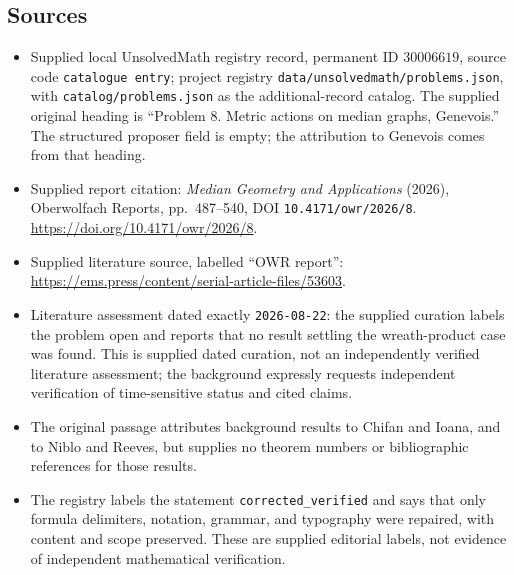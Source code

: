 \documentclass[11pt]{article}
\begin{document}
\subsection{Sources}
\begin{itemize}
\item Supplied local UnsolvedMath registry record, permanent ID \(30006619\), source code \texttt{catalogue entry}; project registry \texttt{data/unsolvedmath/problems.json}, with \texttt{catalog/problems.json} as the additional-record catalog. The supplied original heading is ``Problem 8. Metric actions on median graphs, Genevois.'' The structured proposer field is empty; the attribution to Genevois comes from that heading.
\item Supplied report citation: \emph{Median Geometry and Applications} (2026), Oberwolfach Reports, pp.\ 487--540, DOI \texttt{10.4171/owr/2026/8}. \url{https://doi.org/10.4171/owr/2026/8}.
\item Supplied literature source, labelled ``OWR report'': \url{https://ems.press/content/serial-article-files/53603}.
\item Literature assessment dated exactly \texttt{2026-08-22}: the supplied curation labels the problem open and reports that no result settling the wreath-product case was found. This is supplied dated curation, not an independently verified literature assessment; the background expressly requests independent verification of time-sensitive status and cited claims.
\item The original passage attributes background results to Chifan and Ioana, and to Niblo and Reeves, but supplies no theorem numbers or bibliographic references for those results.
\item The registry labels the statement \texttt{corrected\_verified} and says that only formula delimiters, notation, grammar, and typography were repaired, with content and scope preserved. These are supplied editorial labels, not evidence of independent mathematical verification.
\end{itemize}
\end{document}
